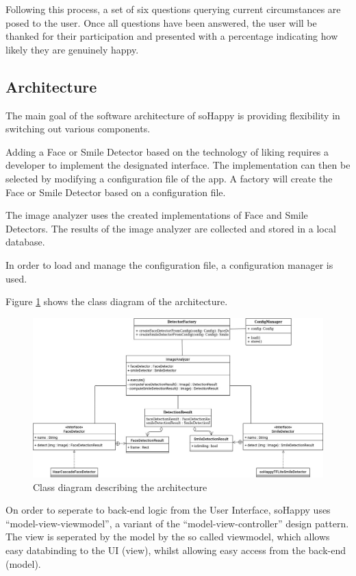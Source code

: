 Following this process, a set of six questions querying current circumstances are posed to the user. Once all questions have been answered, the user will be thanked for their participation and presented with a percentage indicating how likely they are genuinely happy.

\subsection{Architecture}

The main goal of the software architecture of soHappy is providing flexibility 
in switching out various components.

Adding a Face or Smile Detector based on the technology of liking requires a
developer to implement the designated interface. The implementation can then be 
selected by modifying a configuration file of the app. A factory will create 
the Face or Smile Detector based on a configuration file. 

The image analyzer uses the created implementations of Face and Smile
Detectors. The results of the image analyzer are collected and stored in a
local database.

In order to load and manage the configuration file, a configuration manager 
is used.

Figure \ref{fig:arch1} shows the class diagram of the architecture.

\begin{figure}
    \includegraphics[width=\linewidth]{figures/methodology_architecture_1.jpg}
    \caption{Class diagram describing the architecture}
    \label{fig:arch1}
\end{figure}

On order to seperate to back-end logic from the User Interface, soHappy uses
``model-view-viewmodel'', a variant of the ``model-view-controller'' design 
pattern. The view is seperated by the model by the so called viewmodel, which
allows easy databinding to the UI (view), whilst allowing easy access from the
back-end (model). \cite{mvvm}

